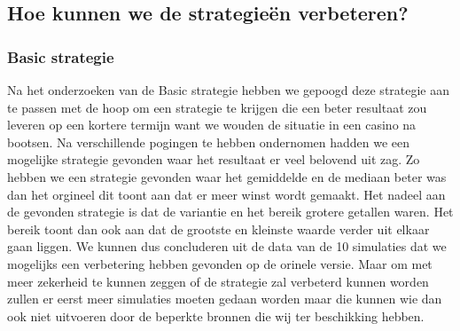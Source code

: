 \documentclass[conference]{IEEEtran}
\begin{document}
\subsection{Hoe kunnen we de strategie\"{e}n verbeteren?}
\subsubsection{Basic strategie}
Na het onderzoeken van de Basic strategie hebben we gepoogd deze strategie aan te passen met de hoop om een strategie te krijgen die een beter resultaat zou leveren op een kortere termijn want we wouden de situatie in een casino na bootsen. Na verschillende pogingen te hebben ondernomen hadden we een mogelijke strategie gevonden waar het resultaat er veel belovend uit zag. Zo hebben we een strategie gevonden waar het gemiddelde en de mediaan beter was dan het orgineel dit toont aan dat er meer winst wordt gemaakt. Het nadeel aan de gevonden strategie is dat de variantie en het bereik grotere getallen waren. Het bereik toont dan ook aan dat de grootste en kleinste waarde verder uit elkaar gaan liggen. We kunnen dus concluderen uit de data van de 10 simulaties dat we mogelijks een verbetering hebben gevonden op de orinele versie. Maar om met meer zekerheid te kunnen zeggen of de strategie zal verbeterd kunnen worden zullen er eerst meer simulaties moeten gedaan worden maar die kunnen wie dan ook niet uitvoeren door de beperkte bronnen die wij ter beschikking hebben.
\end{document}

